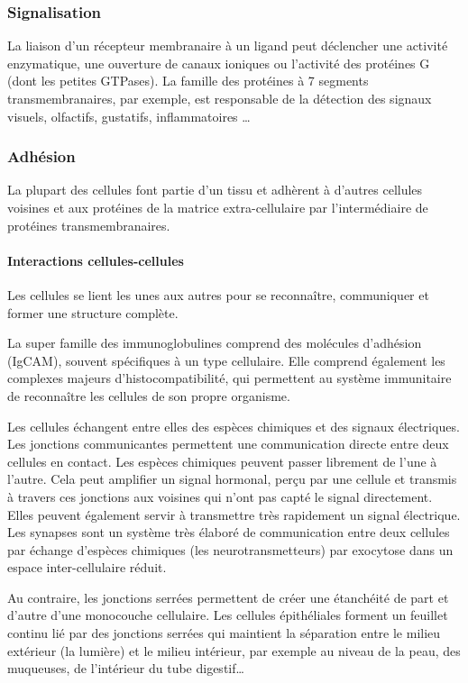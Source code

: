 \subsubsection{Signalisation}

La liaison d'un récepteur membranaire à un ligand peut déclencher une activité enzymatique, une ouverture de canaux ioniques ou l'activité des protéines G (dont les petites GTPases). 
La famille des protéines à 7 segments transmembranaires, par exemple, est responsable de la détection des signaux visuels, olfactifs, gustatifs, inflammatoires \dots

\subsubsection{Adhésion}

La plupart des cellules font partie d'un tissu et adhèrent à d'autres cellules voisines et aux protéines de la matrice extra-cellulaire par l'intermédiaire de protéines transmembranaires. 

\paragraph{Interactions cellules-cellules}Les cellules se lient les unes aux autres pour se reconnaître, communiquer et former une structure complète. 

La super famille des immunoglobulines comprend des molécules d'adhésion (IgCAM), souvent spécifiques à un type cellulaire. Elle comprend également les complexes majeurs d'histocompatibilité, qui permettent au système immunitaire de reconnaître les cellules de son propre organisme. 

Les cellules échangent entre elles des espèces chimiques et des signaux électriques. 
Les jonctions communicantes permettent une communication directe entre deux cellules en contact. Les espèces chimiques peuvent passer librement de l'une à l'autre. Cela peut amplifier un signal hormonal, perçu par une cellule et transmis à travers ces jonctions aux voisines qui n'ont pas capté le signal directement. Elles peuvent également servir à transmettre très rapidement un signal électrique. 
Les synapses sont un système très élaboré de communication entre deux cellules par échange d'espèces chimiques (les neurotransmetteurs) par exocytose dans un espace inter-cellulaire réduit. 

Au contraire, les jonctions serrées permettent de créer une étanchéité de part et d'autre d'une monocouche cellulaire. Les cellules épithéliales forment un feuillet continu lié par des jonctions serrées qui maintient la séparation entre le milieu extérieur (la lumière) et le milieu intérieur, par exemple au niveau de la peau, des muqueuses, de l'intérieur du tube digestif\dots


